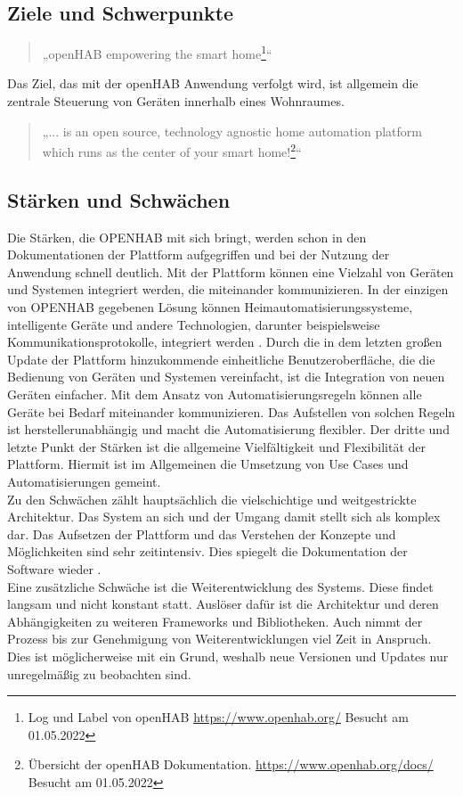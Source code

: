 \subsection{Ziele und Schwerpunkte} 
    \begin{quote}
        „openHAB empowering the smart home\footnote{Log und Label von openHAB \url{https://www.openhab.org/} Besucht am 01.05.2022}“
    \end{quote}
    Das Ziel, das mit der openHAB Anwendung verfolgt wird, ist allgemein die zentrale Steuerung von Geräten innerhalb eines 
    Wohnraumes.
    \begin{quote}
        „... is an open source, technology agnostic home automation platform which runs as the center of your smart home!\footnote{Übersicht der openHAB Dokumentation. \url{https://www.openhab.org/docs/} Besucht am 01.05.2022}“
    \end{quote}
    
\subsection{Stärken und Schwächen}
    Die Stärken, die \acs{OPENHAB} mit sich bringt, werden schon in den Dokumentationen der Plattform aufgegriffen und bei der Nutzung der Anwendung 
    schnell deutlich. Mit der Plattform können eine Vielzahl von Geräten und Systemen integriert werden, die miteinander 
    kommunizieren. In der einzigen von \acs{OPENHAB} gegebenen Lösung können Heimautomatisierungssysteme, intelligente Geräte und 
    andere Technologien, darunter beispielsweise Kommunikationsprotokolle, integriert werden \cite{openhab-strength}. Durch die in 
    dem letzten großen Update der Plattform hinzukommende einheitliche Benutzeroberfläche, die die Bedienung von Geräten und 
    Systemen vereinfacht, ist die Integration von neuen Geräten einfacher. Mit dem Ansatz von 
    Automatisierungsregeln können alle Geräte bei Bedarf miteinander kommunizieren. Das Aufstellen von solchen Regeln ist 
    herstellerunabhängig und macht die Automatisierung flexibler. Der dritte und letzte Punkt der Stärken ist die allgemeine 
    Vielfältigkeit und Flexibilität der Plattform. Hiermit ist im Allgemeinen die Umsetzung von Use Cases und Automatisierungen 
    gemeint.
    \\
    \linebreak
    Zu den Schwächen zählt hauptsächlich die vielschichtige und weitgestrickte Architektur.
    Das System an sich 
    und der Umgang damit stellt sich als komplex dar. Das Aufsetzen der Plattform und das Verstehen der Konzepte und  
    Möglichkeiten sind sehr zeitintensiv. Dies spiegelt die Dokumentation der Software wieder \cite{openhab-strength}. 
    \\
    Eine zusätzliche Schwäche ist die Weiterentwicklung des Systems. Diese findet langsam und nicht konstant statt. Auslöser 
    dafür ist die Architektur und deren Abhängigkeiten zu weiteren Frameworks und Bibliotheken. Auch nimmt der Prozess bis zur 
    Genehmigung von Weiterentwicklungen viel Zeit in Anspruch. Dies ist möglicherweise mit ein Grund, weshalb neue Versionen und 
    Updates nur unregelmäßig zu beobachten sind. 

